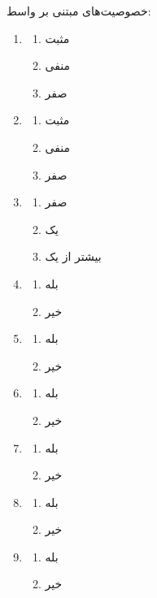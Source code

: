 \documentclass{article}
\begin{document}
خصوصیت‌های مبتنی بر واسط:
\begin{enumerate}
	\item {}
	\begin{enumerate}
	\item مثبت
	\item منفی
	\item صفر
	\end{enumerate}
	\item {}
	\begin{enumerate}
	\item مثبت
	\item منفی
	\item صفر
	\end{enumerate}
	\item {}
	\begin{enumerate}
	\item صفر
	\item یک 
	\item بیشتر از یک
	\end{enumerate}
	\item {}
	\begin{enumerate}
	\item بله
	\item خیر 
	\end{enumerate}
		\item {}
	\begin{enumerate}
	\item بله
	\item خیر 
	\end{enumerate}
    \item {}
    \begin{enumerate}
    \item بله
    \item خیر
    \end{enumerate}
    \item {}
    \begin{enumerate}
    \item بله
    \item خیر
    \end{enumerate}
    \item {}
    \begin{enumerate}
    \item بله
    \item خیر
    \end{enumerate}
    \item {}
    \begin{enumerate}
    \item بله
    \item خیر
    \end{enumerate}
\end{enumerate}
\end{document}
